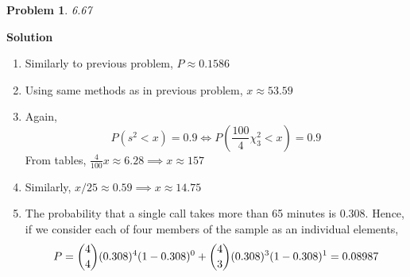 \documentclass[8pt]{article} %
\newtheorem{prob}{Problem}
\newenvironment{solution}%
{\par\textbf{Solution}\space }%
{\par}
\begin{document}
\begin{prob}6.67\end{prob}
\begin{solution}
\begin{enumerate}[label=\alph*.]
	\item{Similarly to previous problem, $P\approx 0.1586$

		}
	\item{Using same methods as in previous problem, $x\approx 53.59$
		}
	\item{Again,
		\[P(s^2<x)=0.9\iff P(\frac{100}{4}\chi_3^2<x)=0.9\]
		From tables, $\frac{4}{100}x\approx 6.28\implies x\approx 157$
		}
	\item{Similarly, $x/25\approx 0.59\implies x\approx 14.75$}
	\item{The probability that a single call takes more than 65 minutes is $0.308$. Hence, if we consider each of four members of the sample
		as an individual elements,
		\[P=\dbinom{4}{4}(0.308)^4(1-0.308)^0+\dbinom{4}{3}(0.308)^3(1-0.308)^1=0.08987\]
		}
\end{enumerate}
\end{solution}
\end{document}
